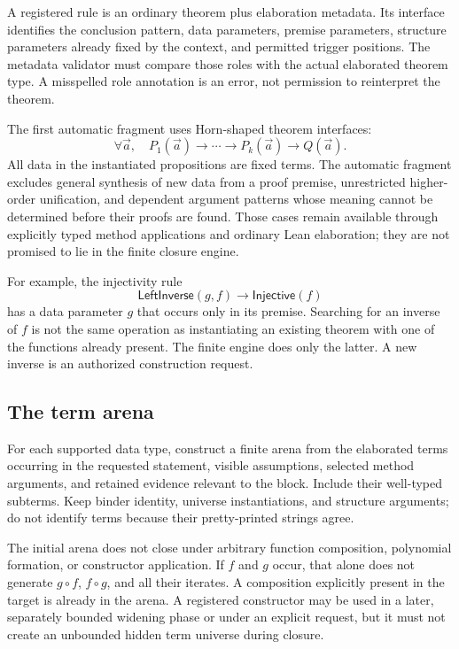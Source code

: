 \documentclass[11pt,a4paper]{article}
\newcommand{\code}[1]{\texttt{\detokenize{#1}}}
\theoremstyle{definition}
\theoremstyle{remark}
\begin{document}
A registered rule is an ordinary theorem plus elaboration metadata. Its
interface identifies the conclusion pattern, data parameters, premise
parameters, structure parameters already fixed by the context, and permitted
trigger positions. The metadata validator must compare those roles with the
actual elaborated theorem type. A misspelled role annotation is an error, not
permission to reinterpret the theorem.

The first automatic fragment uses Horn-shaped theorem interfaces:
\[
 \forall\vec a,\quad P_1(\vec a)\to\cdots\to P_k(\vec a)\to Q(\vec a).
\]
All data in the instantiated propositions are fixed terms. The automatic
fragment excludes general synthesis of new data from a proof premise,
unrestricted higher-order unification, and dependent argument patterns whose
meaning cannot be determined before their proofs are found. Those cases remain
available through explicitly typed method applications and ordinary Lean
elaboration; they are not promised to lie in the finite closure engine.

For example, the injectivity rule
\[
 \mathsf{LeftInverse}(g,f)\to\mathsf{Injective}(f)
\]
has a data parameter $g$ that occurs only in its premise. Searching for an
inverse of $f$ is not the same operation as instantiating an existing theorem
with one of the functions already present. The finite engine does only the
latter. A new inverse is an authorized construction request.

\subsection{The term arena}

For each supported data type, construct a finite arena from the elaborated
terms occurring in the requested statement, visible assumptions, selected
method arguments, and retained evidence relevant to the block. Include their
well-typed subterms. Keep binder identity, universe instantiations, and
structure arguments; do not identify terms because their pretty-printed
strings agree.

The initial arena does not close under arbitrary function composition,
polynomial formation, or constructor application. If $f$ and $g$ occur, that
alone does not generate $g\circ f$, $f\circ g$, and all their iterates. A
composition explicitly present in the target is already in the arena. A
registered constructor may be used in a later, separately bounded widening
phase or under an explicit \code{consider} request, but it must not create an
unbounded hidden term universe during closure.
\end{document}
